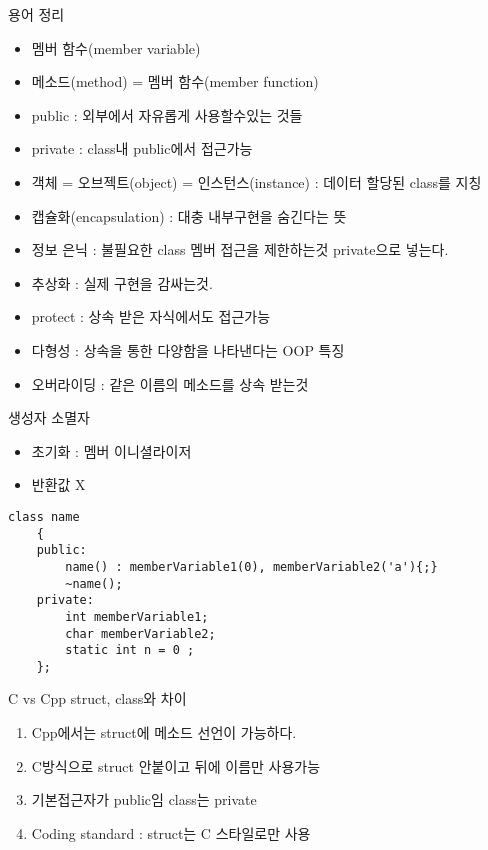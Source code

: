 \documentclass[10pt]{beamer}
\begin{document}
\begin{frame}{용어 정리}
    \begin{itemize}
        \item 멤버 함수(member variable)
        \item 메소드(method) = 멤버 함수(member function)
        \item public : 외부에서 자유롭게 사용할수있는 것들
        \item private : class내 public에서 접근가능
        \item 객체 = 오브젝트(object) = 인스턴스(instance) : 데이터 할당된 class를 지칭
        \item 캡슐화(encapsulation) : 대충 내부구현을 숨긴다는 뜻
        \item 정보 은닉 : 불필요한 class 멤버 접근을 제한하는것 private으로 넣는다.
        \item 추상화 : 실제 구현을 감싸는것.
        \item protect : 상속 받은 자식에서도 접근가능
        \item 다형성 : 상속을 통한 다양함을 나타낸다는 OOP 특징
        \item 오버라이딩 : 같은 이름의 메소드를 상속 받는것
    \end{itemize}
\end{frame}

\begin{frame}[fragile]{생성자 소멸자}
    \begin{itemize}
        \item 초기화 : 멤버 이니셜라이저
        \item 반환값 X
    \end{itemize}
    
    \begin{lstlisting}[style = CppStyle]
    class name
    {
    public:
        name() : memberVariable1(0), memberVariable2('a'){;}
        ~name();
    private:
        int memberVariable1;
        char memberVariable2;
        static int n = 0 ;
    };
    \end{lstlisting}
\end{frame}    




\begin{frame}{C vs Cpp struct, class와 차이}
    \begin{enumerate}
        \item Cpp에서는 struct에 메소드 선언이 가능하다.
        \item C방식으로 struct 안붙이고 뒤에 이름만 사용가능
        \item 기본접근자가 public임 class는 private
        \item Coding standard : struct는 C 스타일로만 사용
    \end{enumerate}
\end{frame}    
\end{document}
